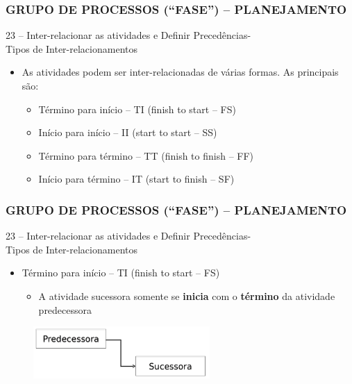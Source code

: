\begin{frame}
 \frametitle{GRUPO DE PROCESSOS (“FASE”) – PLANEJAMENTO}
23 – Inter-relacionar as atividades e Definir Precedências-\\
Tipos de Inter-relacionamentos
  \begin{itemize}
   \item As atividades podem ser inter-relacionadas de várias formas. As principais são:
   \begin{itemize}
    \item Término para início – TI (finish to start – FS)
    \item Início para início – II (start to start – SS)
    \item  Término para término – TT (finish to finish – FF)
    \item Início para término – IT (start to finish – SF)
   \end{itemize}
  \end{itemize}
\end{frame}

\begin{frame}
 \frametitle{GRUPO DE PROCESSOS (“FASE”) – PLANEJAMENTO}
23 – Inter-relacionar as atividades e Definir Precedências-\\
Tipos de Inter-relacionamentos
  \begin{itemize}
   \item Término para início – TI (finish to start – FS)
   \begin{itemize}
    \item A atividade sucessora somente se \textbf{inicia} com o \textbf{término} da atividade predecessora
   \end{itemize}
  \end{itemize}
  \begin{figure}
   \centering
   \includegraphics[width = 0.6\textwidth]{figs/fig4.png}
  \end{figure}
\end{frame}

